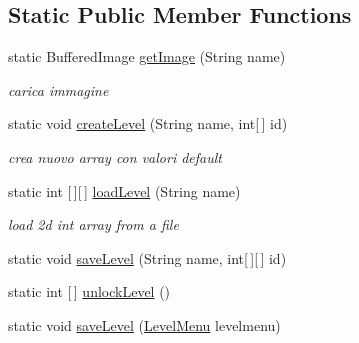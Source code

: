 \subsection*{Static Public Member Functions}
\begin{DoxyCompactItemize}
\item 
static Buffered\+Image \hyperlink{classhelpz_1_1_load_save_adfcdec0c763af178ffbfea94f4ccd263}{get\+Image} (String name)
\begin{DoxyCompactList}\small\item\em carica immagine \end{DoxyCompactList}\item 
static void \hyperlink{classhelpz_1_1_load_save_a934717f63182b47ab05a70ec40cef235}{create\+Level} (String name, int\mbox{[}$\,$\mbox{]} id)
\begin{DoxyCompactList}\small\item\em crea nuovo array con valori default \end{DoxyCompactList}\item 
static int \mbox{[}$\,$\mbox{]}\mbox{[}$\,$\mbox{]} \hyperlink{classhelpz_1_1_load_save_a9dbd50db72db31e6a9c5c423d4e48be3}{load\+Level} (String name)
\begin{DoxyCompactList}\small\item\em load 2d int array from a file \end{DoxyCompactList}\item 
static void \hyperlink{classhelpz_1_1_load_save_ae7a60134f1712407689bfe3c45bc04a1}{save\+Level} (String name, int\mbox{[}$\,$\mbox{]}\mbox{[}$\,$\mbox{]} id)
\item 
static int \mbox{[}$\,$\mbox{]} \hyperlink{classhelpz_1_1_load_save_a1369888f20d8279b649d556082d38e72}{unlock\+Level} ()
\item 
static void \hyperlink{classhelpz_1_1_load_save_a518631414c15c47704a28422e8fbdc33}{save\+Level} (\hyperlink{classui_1_1_level_menu}{Level\+Menu} levelmenu)
\end{DoxyCompactItemize}
